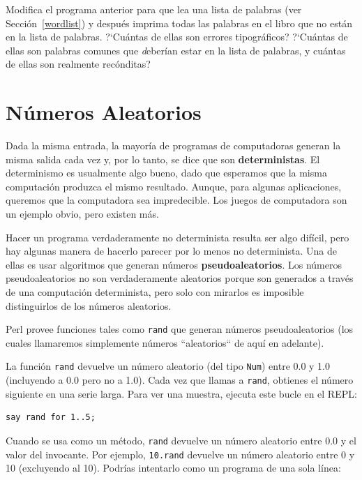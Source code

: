 \begin{exercise}

Modifica el programa anterior para que lea una lista de palabras (ver Sección~\ref{wordlist})
y después imprima todas las palabras en el libro que no están en la 
lista de palabras. ?`Cuántas de ellas son errores tipográficos? ?`Cuántas de ellas
son palabras comunes que {\emph deberían} estar en la lista de palabras, y cuántas de
ellas son realmente recónditas?

\end{exercise}


\section{Números Aleatorios}

Dada la misma entrada, la mayoría de programas de computadoras generan
la misma salida cada vez y, por lo tanto, se dice que son {\bf deterministas}.
El determinismo es usualmente algo bueno, dado que esperamos que 
la misma computación produzca el mismo resultado. Aunque, para algunas aplicaciones,
queremos que la computadora sea impredecible. Los juegos de computadora
son un ejemplo obvio, pero existen más.

Hacer un programa verdaderamente no determinista resulta ser algo difícil,
pero hay algunas manera de hacerlo parecer por lo menos no determinista. 
Una de ellas es usar algoritmos que generan números {\bf pseudoaleatorios}.
Los números pseudoaleatorios no son verdaderamente aleatorios porque son
generados a través de una computación determinista, pero solo con mirarlos
es imposible distinguirlos de los números aleatorios.

Perl provee funciones tales como {\tt rand} que generan números pseudoaleatorios
(los cuales llamaremos simplemente números ``aleatorios`` de aquí en adelante).

La función {\tt rand} devuelve un número aleatorio (del tipo {\tt Num}) entre
0.0 y 1.0 (incluyendo a 0.0 pero no a 1.0). Cada vez que llamas a {\tt rand},
obtienes el número siguiente en una serie larga. Para ver una muestra, ejecuta
este bucle en el REPL:

\begin{verbatim}
say rand for 1..5;
\end{verbatim}

Cuando se usa como un método, {\tt rand} devuelve un número aleatorio entre
0.0 y el valor del invocante. Por ejemplo, {\tt 10.rand} devuelve un número
aleatorio entre 0 y 10 (excluyendo al 10). Podrías intentarlo como un programa
de una sola línea:

